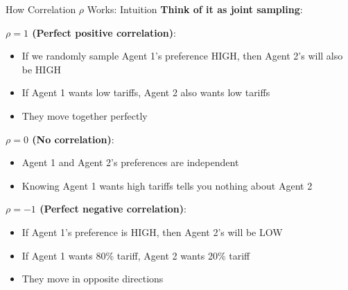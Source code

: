 \documentclass{beamer}
\begin{document}
\begin{frame}{How Correlation $\rho$ Works: Intuition}
\textbf{Think of it as joint sampling}:

\vspace{0.3cm}

\textbf{$\rho = 1$ (Perfect positive correlation)}:
\begin{itemize}
    \item If we randomly sample Agent 1's preference HIGH, then Agent 2's will also be HIGH
    \item If Agent 1 wants low tariffs, Agent 2 also wants low tariffs
    \item They move together perfectly
\end{itemize}

\vspace{0.3cm}

\textbf{$\rho = 0$ (No correlation)}:
\begin{itemize}
    \item Agent 1 and Agent 2's preferences are independent
    \item Knowing Agent 1 wants high tariffs tells you nothing about Agent 2
\end{itemize}

\vspace{0.3cm}

\textbf{$\rho = -1$ (Perfect negative correlation)}:
\begin{itemize}
    \item If Agent 1's preference is HIGH, then Agent 2's will be LOW
    \item If Agent 1 wants 80\% tariff, Agent 2 wants 20\% tariff
    \item They move in opposite directions
\end{itemize}
\end{frame}
\end{document}

